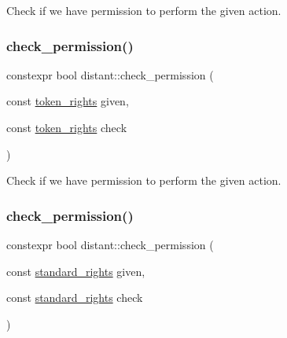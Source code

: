 Check if we have permission to perform the given action. 

\mbox{\label{namespacedistant_ab4c8d0b26c0d701a24aa376f1a3f72d1}} 
\subsubsection{\texorpdfstring{check\+\_\+permission()}{check\_permission()}\hspace{0.1cm}{\footnotesize\ttfamily [2/3]}}
{\footnotesize\ttfamily constexpr bool distant\+::check\+\_\+permission (\begin{DoxyParamCaption}\item[{const \mbox{\hyperlink{structdistant_1_1access__rights_a6b4d9e837868c8c15cf407e4c80d7f3c}{token\+\_\+rights}}}]{given,  }\item[{const \mbox{\hyperlink{structdistant_1_1access__rights_a6b4d9e837868c8c15cf407e4c80d7f3c}{token\+\_\+rights}}}]{check }\end{DoxyParamCaption})\hspace{0.3cm}{\ttfamily [noexcept]}}



Check if we have permission to perform the given action. 

\mbox{\label{namespacedistant_a05d464175f86520364e566dd7ee21dc4}} 
\subsubsection{\texorpdfstring{check\+\_\+permission()}{check\_permission()}\hspace{0.1cm}{\footnotesize\ttfamily [3/3]}}
{\footnotesize\ttfamily constexpr bool distant\+::check\+\_\+permission (\begin{DoxyParamCaption}\item[{const \mbox{\hyperlink{structdistant_1_1access__rights_a1aa121d7e246b51f7386f992adce1664}{standard\+\_\+rights}}}]{given,  }\item[{const \mbox{\hyperlink{structdistant_1_1access__rights_a1aa121d7e246b51f7386f992adce1664}{standard\+\_\+rights}}}]{check }\end{DoxyParamCaption})\hspace{0.3cm}{\ttfamily [noexcept]}}



